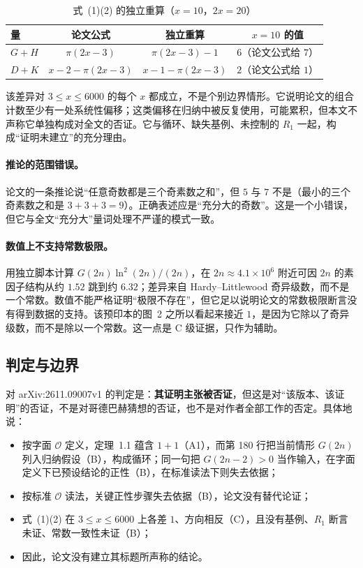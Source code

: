 \documentclass[11pt,a4paper]{ctexart}
\theoremstyle{plain}
\theoremstyle{definition}
\begin{document}
\begin{table}[htbp]
\centering
\small
\caption{式~(1)(2) 的独立重算（$x=10$，$2x=20$）}
\label{tab:numerical}
\begin{tabular}{@{}lccc@{}}
\toprule
量 & 论文公式 & 独立重算 & $x=10$ 的值\\
\midrule
$G+H$ & $\pi(2x-3)$ & $\pi(2x-3)-1$ & $6$（论文公式给 $7$）\\
$D+K$ & $x-2-\pi(2x-3)$ & $x-1-\pi(2x-3)$ & $2$（论文公式给 $1$）\\
\bottomrule
\end{tabular}
\end{table}

该差异对 $3\le x\le6000$ 的每个 $x$ 都成立，不是个别边界情形。它说明论文的组合计数至少有一处系统性偏移；这类偏移在归纳中被反复使用，可能累积，但本文不声称它单独构成对全文的否证。它与循环、缺失基例、未控制的 $R_1$ 一起，构成“证明未建立”的充分理由。

\paragraph{推论的范围错误。}
论文的一条推论说“任意奇数都是三个奇素数之和”，但 $5$ 与 $7$ 不是（最小的三个奇素数之和是 $3+3+3=9$）。正确表述应是“充分大的奇数”。这是一个小错误，但它与全文“充分大”量词处理不严谨的模式一致。

\paragraph{数值上不支持常数极限。}
用独立脚本计算 $G(2n)\ln^2(2n)/(2n)$，在 $2n\approx4.1\times10^6$ 附近可因 $2n$ 的素因子结构从约 $1.52$ 跳到约 $6.32$；差异来自 Hardy--Littlewood 奇异级数，而不是一个常数。数值不能严格证明“极限不存在”，但它足以说明论文的常数极限断言没有得到数据的支持。该预印本的图~2 之所以看起来接近 $1$，是因为它除以了奇异级数，而不是除以一个常数。这一点是 C 级证据，只作为辅助。

\subsection{判定与边界}
\label{sec:paper-verdict}

对 arXiv:2611.09007v1 的判定是：\textbf{其证明主张被否证}，但这是对“该版本、该证明”的否证，不是对哥德巴赫猜想的否证，也不是对作者全部工作的否定。具体地说：

\begin{itemize}
\item 按字面 $\mathcal O$ 定义，定理~1.1 蕴含 $1+1$（A1），而第 180 行把当前情形 $G(2n)$ 列入归纳假设（B），构成循环；同一句把 $G(2n-2)>0$ 当作输入，在字面定义下已预设结论的正性（B），在标准读法下则失去依据；
\item 按标准 $\mathcal O$ 读法，关键正性步骤失去依据（B），论文没有替代论证；
\item 式~(1)(2) 在 $3\le x\le6000$ 上各差 $1$、方向相反（C），且没有基例、$R_1$ 断言未证、常数一致性未证（B）；
\item 因此，论文没有建立其标题所声称的结论。
\end{itemize}
\end{document}
